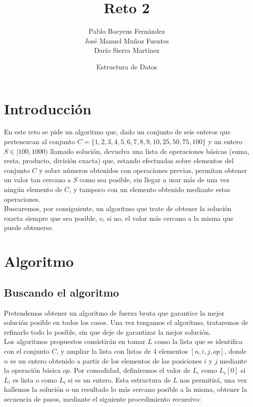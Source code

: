 \documentclass{article}
\title{Reto 2}
\date{Estructura de Datos}
\author{Pablo Baeyens Fernández\\José Manuel Muñoz Fuentes\\Darío Sierra Martínez}
\begin{document}
\maketitle

\section{Introducción}
En este reto se pide un algoritmo que, dado un conjunto de seis enteros que
pertenezcan al conjunto $C = \{1, 2, 3, 4, 5, 6, 7, 8, 9, 10, 25, 50, 75, 100\}$
y un entero $S \in [100, 1000)$ llamado solución, devuelva una lista de
operaciones básicas (suma, resta, producto, división exacta) que, estando
efectuadas sobre elementos del conjunto $C$ y sobre números obtenidos con
operaciones previas, permitan obtener un valor tan cercano a $S$ como sea
posible, sin llegar a usar más de una vez ningún elemento de $C$, y tampoco con
un elemento obtenido mediante estas operaciones. \\

Buscaremos, por consiguiente, un algoritmo que trate de obtener la solución
exacta siempre que sea posible, o, si no, el valor más cercano a la misma que
puede obtenerse.

\section{Algoritmo}
\subsection{Buscando el algoritmo}
Pretendemos obtener un algoritmo de fuerza bruta que garantice la mejor solución
posible en todos los casos. Una vez tengamos el algoritmo, trataremos de
refinarlo todo lo posible, sin que deje de garantizar la mejor solución.\\

Los algoritmos propuestos consistirán en tomar $L$ como la lista que se
identifica con el conjunto $C$, y ampliar la lista con listas de 4 elementos
$[n, i, j, op]$, donde $n$ es un entero obtenido a partir de los elementos de
las posiciones $i$ y $j$ mediante la operación básica $op$. Por comodidad,
definiremos el valor de $L_i$ como $L_i[0]$ si $L_i$ es lista o como $L_i$ si es
un entero. Esta estructura de $L$ nos permitirá, una vez hallemos la solución o
un resultado lo más cercano posible a la misma, obtener la secuencia de pasos,
mediante el siguiente procedimiento recursivo: \\
\end{document}
